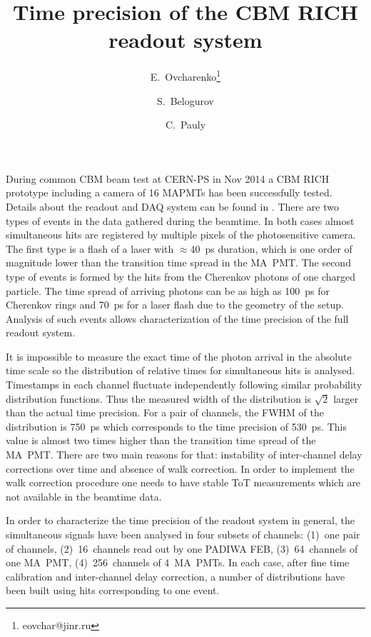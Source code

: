 \documentclass{JACoW-GSI-2015}
\begin{document}
\title{Time precision of the CBM RICH readout system}

\author[1]{E.~Ovcharenko\thanks{eovchar@jinr.ru}}
\author[1]{S.~Belogurov}
\author[2]{C.~Pauly}


\maketitle

During common CBM beam test at CERN-PS in Nov 2014 a CBM RICH prototype including a camera of 16 MAPMTs has been successfully tested. Details about the readout and DAQ system can be found in \cite{RICH2016, PEPANL}. There are two types of events in the data gathered during the beamtime. In both cases almost simultaneous hits are registered by multiple pixels of the photosensitive camera. The first type is a flash of a laser with $\approx$40~ps duration, which is one order of magnitude lower than the transition time spread in the MA~PMT. The second type of events is formed by the hits from the Cherenkov photons of one charged particle. The time spread of arriving photons can be as high as 100~ps for Cherenkov rings and 70~ps for a laser flash due to the geometry of the setup. Analysis of such events allows characterization of the time precision of the full readout system.

It is impossible to measure the exact time of the photon arrival in the absolute time scale so the distribution of relative times for simultaneous hits is analysed. Timestamps in each channel fluctuate independently following similar probability distribution functions. Thus the measured width of the distribution is $\sqrt 2$ larger than the actual time precision. For a pair of channels, the FWHM of the distribution is 750~ps which corresponds to the time precision of 530~ps. This value is almost two times higher than the transition time spread of the MA~PMT. There are two main reasons for that: instability of inter-channel delay corrections over time and absence of walk correction. In order to implement the walk correction procedure one needs to have stable ToT measurements which are not available in the beamtime data.

In order to characterize the time precision of the readout system in general, the simultaneous signals have been analysed in four subsets of channels: (1)~one pair of channels, (2)~16~channels read out by one PADIWA FEB, (3)~64~channels of one MA~PMT, (4)~256~channels of 4~MA~PMTs. In each case, after fine time calibration and inter-channel delay correction, a number of distributions have been built using hits corresponding to one event.
\end{document}
